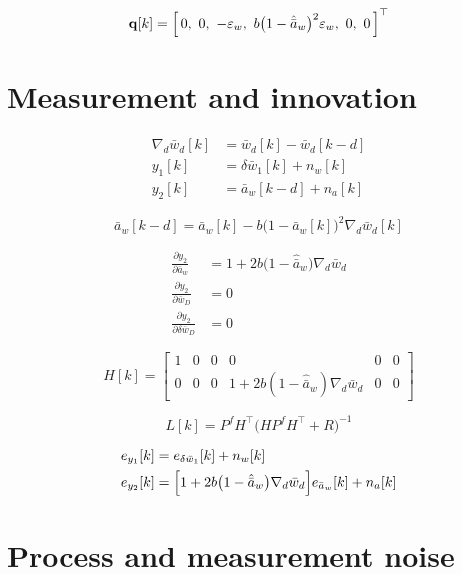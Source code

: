 \documentclass[11pt,a4paper,fontset=none]{ctexart}
\newcommand{\ba}{\bar{a}}
\newcommand{\bw}{\bar{w}}
\newcommand{\bwD}{\bar{w}_D}
\begin{document}
\begin{equation*}
\mathbf{q}[k] = \Bigl[\,0,\ 0,\ -\varepsilon_w,\
b\bigl(1-\hat{\ba}_w\bigr)^{2}\varepsilon_w,\ 0,\ 0\,\Bigr]^{\top}
\end{equation*}

\section{Measurement and innovation}

\begin{align*}
\nabla_d\bw_d[k] &= \bw_d[k] - \bw_d[k-d] \\
y_1[k] &= \delta\bw_1[k] + n_w[k] \\
y_2[k] &= \ba_w[k-d] + n_a[k]
\end{align*}

\begin{equation*}
\ba_w[k-d] = \ba_w[k]
  - b\bigl(1-\ba_w[k]\bigr)^{2}\nabla_d\bw_d[k]
\end{equation*}

\begin{align*}
\frac{\partial y_2}{\partial \ba_w} &= 1 + 2b\bigl(1-\hat{\ba}_w\bigr)\nabla_d\bw_d \\
\frac{\partial y_2}{\partial \bwD}  &= 0 \\
\frac{\partial y_2}{\partial \delta\bwD} &= 0
\end{align*}

\begin{equation*}
H[k] =
\begin{bmatrix}
1 & 0 & 0 & 0 & 0 & 0 \\
0 & 0 & 0 & 1 + 2b(1-\hat{\ba}_w)\nabla_d\bw_d & 0 & 0
\end{bmatrix}
\end{equation*}

\begin{equation*}
L[k] = P^f H^{\top}\bigl(HP^fH^{\top}+R\bigr)^{-1}
\end{equation*}

\begin{align*}
e_{y_1}[k] &= e_{\delta\bw_1}[k] + n_w[k] \\
e_{y_2}[k] &= \Bigl[1 + 2b\bigl(1-\hat{\ba}_w\bigr)
    \nabla_d\bw_d\Bigr] e_{\ba_w}[k] + n_a[k]
\end{align*}

\section{Process and measurement noise}
\end{document}
